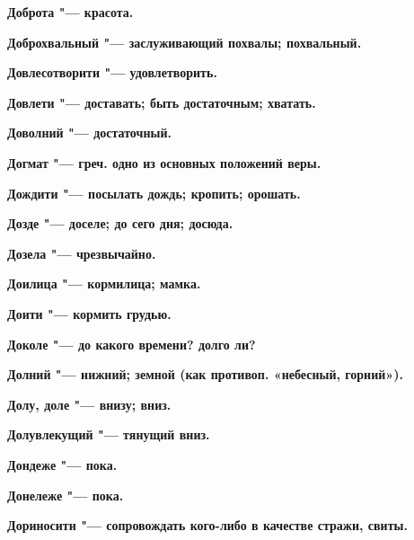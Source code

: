 \begin{mymulticols}{2}
\bfseries Доброта\normalfont{} "--- красота. 




\bfseries Доброхвальный\normalfont{} "--- заслуживающий похвалы; похвальный. 




\bfseries Довлесотворити\normalfont{} "--- удовлетворить. 




\bfseries Довлети\normalfont{} "--- доставать; быть достаточным; хватать. 




\bfseries Доволний\normalfont{} "--- достаточный. 




\bfseries Догмат\normalfont{} "--- греч. одно из основных положений веры. 




\bfseries Дождити\normalfont{} "--- посылать дождь; кропить; орошать. 




\bfseries Дозде\normalfont{} "--- доселе; до сего дня; досюда. 




\bfseries Дозела\normalfont{} "--- чрезвычайно. 




\bfseries Доилица\normalfont{} "--- кормилица; мамка. 




\bfseries Доити\normalfont{} "--- кормить грудью. 




\bfseries Доколе\normalfont{} "--- до какого времени? долго ли? 




\bfseries Долний\normalfont{} "--- нижний; земной (как противоп. «небесный, горний»). 




\bfseries Долу, доле\normalfont{} "--- внизу; вниз. 




\bfseries Долувлекущий\normalfont{} "--- тянущий вниз. 




\bfseries Дондеже\normalfont{} "--- пока. 




\bfseries Донележе\normalfont{} "--- пока. 




\bfseries Дориносити\normalfont{} "--- сопровождать кого-либо в качестве стражи, свиты. 





\end{mymulticols}
